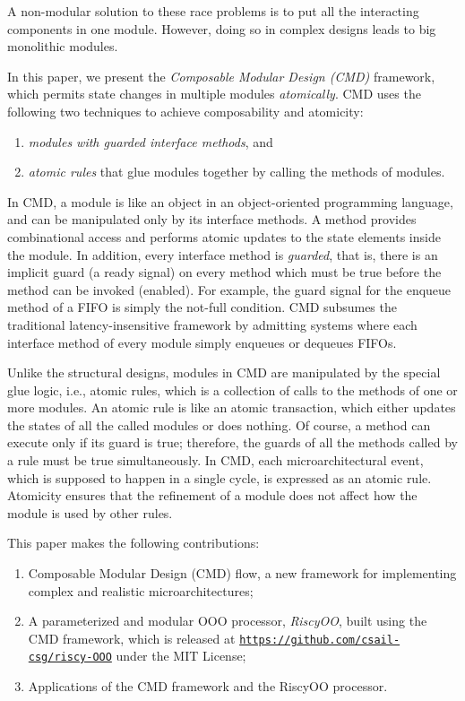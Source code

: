 \documentclass[conference]{IEEEtran}
\begin{document}
A non-modular solution to these race problems is to put all the interacting components in one module.
However, doing so in complex designs leads to big monolithic modules.

In this paper, we present the \emph{Composable Modular Design (CMD)} framework, which permits state changes in multiple modules \emph{atomically}.
CMD uses the following two techniques to achieve composability and atomicity:
\begin{enumerate}
    \item \emph{modules with guarded interface methods}, and
    \item \emph{atomic rules} that glue modules together by calling the methods of modules.
\end{enumerate}

In CMD, a module is like an object in an object-oriented programming language, and can be manipulated only by its interface methods.
A method provides combinational access and performs atomic updates to the state elements inside the module.
In addition, every interface method is \emph{guarded}, that is, there is an implicit guard (a ready signal) on every method which must be true before the method can be invoked (enabled).
For example, the guard signal for the enqueue method of a FIFO is simply the not-full condition.
CMD subsumes the traditional latency-insensitive framework by admitting systems where each interface method of every module simply enqueues or dequeues FIFOs.

Unlike the structural designs, modules in CMD are manipulated by the special glue logic, i.e., atomic rules, which is a collection of calls to the methods of one or more modules.
An atomic rule is like an atomic transaction, which either updates the states of all the called modules  or does nothing.
Of course, a method can execute only if its guard is true; therefore, the guards of all the methods called by a rule must be true simultaneously.
In CMD, each microarchitectural event, which is supposed to happen in a single cycle, is expressed as an atomic rule.
Atomicity ensures that the refinement of a module does not affect how the module is used by other rules.

This paper makes the following contributions:
\begin{enumerate}
    \item Composable Modular Design (CMD) flow, a new framework for implementing complex and realistic microarchitectures;
    
    \item A parameterized and modular OOO processor, \emph{RiscyOO}, built using the CMD framework, which is released at \texttt{\url{https://github.com/csail-csg/riscy-OOO}} under the MIT License;
    
    \item Applications of the CMD framework and the RiscyOO processor.
\end{enumerate}
\end{document}
